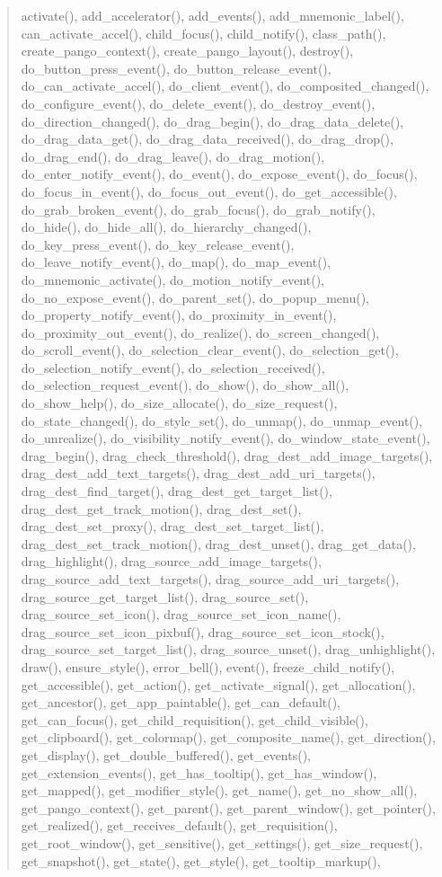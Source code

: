 \begin{quote}
activate(), add\_accelerator(), add\_events(), add\_mnemonic\_label(), can\_activate\_accel(), child\_focus(), child\_notify(), class\_path(), create\_pango\_context(), create\_pango\_layout(), destroy(), do\_button\_press\_event(), do\_button\_release\_event(), do\_can\_activate\_accel(), do\_client\_event(), do\_composited\_changed(), do\_configure\_event(), do\_delete\_event(), do\_destroy\_event(), do\_direction\_changed(), do\_drag\_begin(), do\_drag\_data\_delete(), do\_drag\_data\_get(), do\_drag\_data\_received(), do\_drag\_drop(), do\_drag\_end(), do\_drag\_leave(), do\_drag\_motion(), do\_enter\_notify\_event(), do\_event(), do\_expose\_event(), do\_focus(), do\_focus\_in\_event(), do\_focus\_out\_event(), do\_get\_accessible(), do\_grab\_broken\_event(), do\_grab\_focus(), do\_grab\_notify(), do\_hide(), do\_hide\_all(), do\_hierarchy\_changed(), do\_key\_press\_event(), do\_key\_release\_event(), do\_leave\_notify\_event(), do\_map(), do\_map\_event(), do\_mnemonic\_activate(), do\_motion\_notify\_event(), do\_no\_expose\_event(), do\_parent\_set(), do\_popup\_menu(), do\_property\_notify\_event(), do\_proximity\_in\_event(), do\_proximity\_out\_event(), do\_realize(), do\_screen\_changed(), do\_scroll\_event(), do\_selection\_clear\_event(), do\_selection\_get(), do\_selection\_notify\_event(), do\_selection\_received(), do\_selection\_request\_event(), do\_show(), do\_show\_all(), do\_show\_help(), do\_size\_allocate(), do\_size\_request(), do\_state\_changed(), do\_style\_set(), do\_unmap(), do\_unmap\_event(), do\_unrealize(), do\_visibility\_notify\_event(), do\_window\_state\_event(), drag\_begin(), drag\_check\_threshold(), drag\_dest\_add\_image\_targets(), drag\_dest\_add\_text\_targets(), drag\_dest\_add\_uri\_targets(), drag\_dest\_find\_target(), drag\_dest\_get\_target\_list(), drag\_dest\_get\_track\_motion(), drag\_dest\_set(), drag\_dest\_set\_proxy(), drag\_dest\_set\_target\_list(), drag\_dest\_set\_track\_motion(), drag\_dest\_unset(), drag\_get\_data(), drag\_highlight(), drag\_source\_add\_image\_targets(), drag\_source\_add\_text\_targets(), drag\_source\_add\_uri\_targets(), drag\_source\_get\_target\_list(), drag\_source\_set(), drag\_source\_set\_icon(), drag\_source\_set\_icon\_name(), drag\_source\_set\_icon\_pixbuf(), drag\_source\_set\_icon\_stock(), drag\_source\_set\_target\_list(), drag\_source\_unset(), drag\_unhighlight(), draw(), ensure\_style(), error\_bell(), event(), freeze\_child\_notify(), get\_accessible(), get\_action(), get\_activate\_signal(), get\_allocation(), get\_ancestor(), get\_app\_paintable(), get\_can\_default(), get\_can\_focus(), get\_child\_requisition(), get\_child\_visible(), get\_clipboard(), get\_colormap(), get\_composite\_name(), get\_direction(), get\_display(), get\_double\_buffered(), get\_events(), get\_extension\_events(), get\_has\_tooltip(), get\_has\_window(), get\_mapped(), get\_modifier\_style(), get\_name(), get\_no\_show\_all(), get\_pango\_context(), get\_parent(), get\_parent\_window(), get\_pointer(), get\_realized(), get\_receives\_default(), get\_requisition(), get\_root\_window(), get\_sensitive(), get\_settings(), get\_size\_request(), get\_snapshot(), get\_state(), get\_style(), get\_tooltip\_markup(), 
\end{quote}
